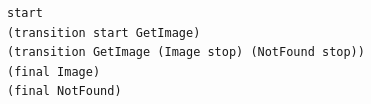 \begin{lstlisting}[language={},basicstyle=\ttfamily\footnotesize,breaklines=true]
start
(transition start GetImage)
(transition GetImage (Image stop) (NotFound stop))
(final Image)
(final NotFound)
\end{lstlisting}
